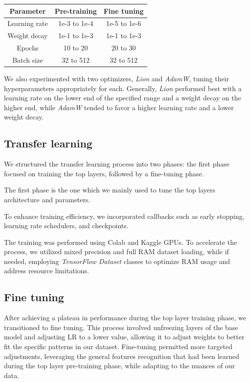 \documentclass[11pt]{article}
\begin{document}
\begin{table}[h!]
    \centering
    \begin{tabular}{|c|c|c|}
        \hline
        \textbf{Parameter} & \textbf{Pre-training} & \textbf{Fine tuning} \\ \hline
        Learning rate & 1e-3 to 1e-4 & 1e-5 to 1e-6 \\ \hline
        Weight decay & 1e-1 to 1e-3 & 1e-1 to 1e-3 \\ \hline
        Epochs & 10 to 20 & 20 to 30 \\ \hline
        Batch size & 32 to 512 & 32 to 512 \\ \hline
    \end{tabular}
\end{table}

We also experimented with two optimizers, \textit{Lion} and \textit{AdamW}, tuning their hyperparameters appropriately for each. Generally, \textit{Lion} performed best with a learning rate on the lower end of the specified range and a weight decay on the higher end, while \textit{AdamW} tended to favor a higher learning rate and a lower weight decay.

\subsection{Transfer learning}

We structured the transfer learning process into two phases: the first phase focused on training the top layers, followed by a fine-tuning phase.

The first phase is the one which we mainly used to tune the top layers architecture and parameters.

To enhance training efficiency, we incorporated callbacks such as early stopping, learning rate schedulers, and checkpoints.

The training was performed using Colab and Kaggle GPUs. To accelerate the process, we utilized mixed precision and full RAM dataset loading, while if needed, employing \textit{TensorFlow Dataset} classes to optimize RAM usage and address resource limitations.

\subsection{Fine tuning}

After achieving a plateau in performance during the top layer training phase, we transitioned to fine tuning. 
This process involved unfreezing layers of the base model and adjusting LR to a lower value, allowing it to adjust weights to better fit the specific patterns in our dataset. 
Fine-tuning permitted more targeted adjustments, leveraging the general features recognition that had been learned during the top layer pre-training phase, while adapting to the nuances of our data.
\end{document}
